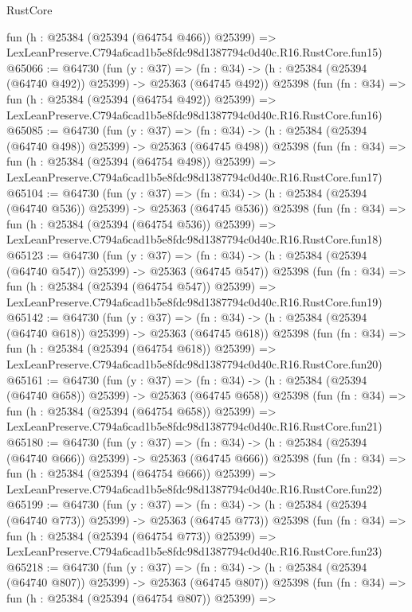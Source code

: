 \begin{lexlean}{RustCore}
\begin{coremodule}
    fun (h : @25384 (@25394 (@64754 @466)) @25399) =>
    LexLeanPreserve.C794a6cad1b5e8fdc98d1387794c0d40c.R16.RustCore.fun15)
@65066 := @64730
    (fun (y : @37) =>
    (fn : @34) -> (h : @25384 (@25394 (@64740 @492)) @25399) -> @25363 (@64745 @492))
    @25398
    (fun (fn : @34) =>
    fun (h : @25384 (@25394 (@64754 @492)) @25399) =>
    LexLeanPreserve.C794a6cad1b5e8fdc98d1387794c0d40c.R16.RustCore.fun16)
@65085 := @64730
    (fun (y : @37) =>
    (fn : @34) -> (h : @25384 (@25394 (@64740 @498)) @25399) -> @25363 (@64745 @498))
    @25398
    (fun (fn : @34) =>
    fun (h : @25384 (@25394 (@64754 @498)) @25399) =>
    LexLeanPreserve.C794a6cad1b5e8fdc98d1387794c0d40c.R16.RustCore.fun17)
@65104 := @64730
    (fun (y : @37) =>
    (fn : @34) -> (h : @25384 (@25394 (@64740 @536)) @25399) -> @25363 (@64745 @536))
    @25398
    (fun (fn : @34) =>
    fun (h : @25384 (@25394 (@64754 @536)) @25399) =>
    LexLeanPreserve.C794a6cad1b5e8fdc98d1387794c0d40c.R16.RustCore.fun18)
@65123 := @64730
    (fun (y : @37) =>
    (fn : @34) -> (h : @25384 (@25394 (@64740 @547)) @25399) -> @25363 (@64745 @547))
    @25398
    (fun (fn : @34) =>
    fun (h : @25384 (@25394 (@64754 @547)) @25399) =>
    LexLeanPreserve.C794a6cad1b5e8fdc98d1387794c0d40c.R16.RustCore.fun19)
@65142 := @64730
    (fun (y : @37) =>
    (fn : @34) -> (h : @25384 (@25394 (@64740 @618)) @25399) -> @25363 (@64745 @618))
    @25398
    (fun (fn : @34) =>
    fun (h : @25384 (@25394 (@64754 @618)) @25399) =>
    LexLeanPreserve.C794a6cad1b5e8fdc98d1387794c0d40c.R16.RustCore.fun20)
@65161 := @64730
    (fun (y : @37) =>
    (fn : @34) -> (h : @25384 (@25394 (@64740 @658)) @25399) -> @25363 (@64745 @658))
    @25398
    (fun (fn : @34) =>
    fun (h : @25384 (@25394 (@64754 @658)) @25399) =>
    LexLeanPreserve.C794a6cad1b5e8fdc98d1387794c0d40c.R16.RustCore.fun21)
@65180 := @64730
    (fun (y : @37) =>
    (fn : @34) -> (h : @25384 (@25394 (@64740 @666)) @25399) -> @25363 (@64745 @666))
    @25398
    (fun (fn : @34) =>
    fun (h : @25384 (@25394 (@64754 @666)) @25399) =>
    LexLeanPreserve.C794a6cad1b5e8fdc98d1387794c0d40c.R16.RustCore.fun22)
@65199 := @64730
    (fun (y : @37) =>
    (fn : @34) -> (h : @25384 (@25394 (@64740 @773)) @25399) -> @25363 (@64745 @773))
    @25398
    (fun (fn : @34) =>
    fun (h : @25384 (@25394 (@64754 @773)) @25399) =>
    LexLeanPreserve.C794a6cad1b5e8fdc98d1387794c0d40c.R16.RustCore.fun23)
@65218 := @64730
    (fun (y : @37) =>
    (fn : @34) -> (h : @25384 (@25394 (@64740 @807)) @25399) -> @25363 (@64745 @807))
    @25398
    (fun (fn : @34) =>
    fun (h : @25384 (@25394 (@64754 @807)) @25399) =>

\end{coremodule}
\end{lexlean}
